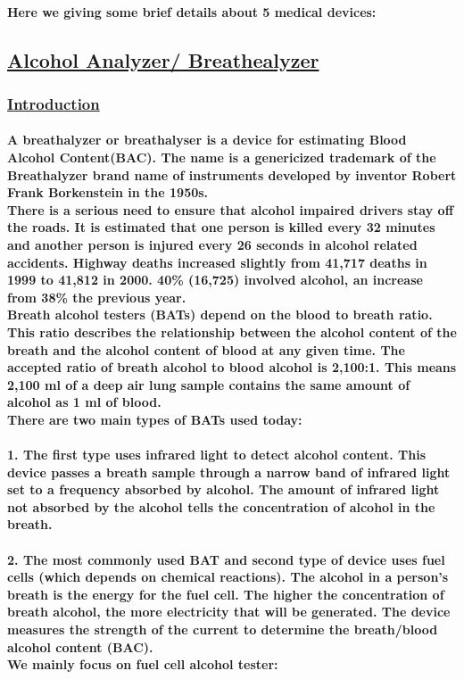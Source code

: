 \documentclass[12pt]{article}
\begin{document}
     \paragraph{Here we giving some brief details about 5 medical devices:  }
      \clearpage
      \subsection{\underline{Alcohol Analyzer/ Breathealyzer}}
        \subsubsection{\underline{Introduction}}
        \paragraph{ A breathalyzer or breathalyser is a device for estimating Blood Alcohol Content(BAC). The name is a genericized trademark of the Breathalyzer brand name of instruments developed by inventor Robert Frank Borkenstein in the 1950s.\\There is a serious need to ensure that alcohol impaired drivers stay off the roads. It is estimated that one person is killed every 32 minutes and another person is injured every 26 seconds in alcohol related accidents. Highway deaths increased slightly from 41,717 deaths in 1999 to 41,812 in 2000. 40\% (16,725) involved alcohol, an increase from 38\% the previous year.\\Breath alcohol testers (BATs) depend on the blood to breath ratio. This ratio describes the relationship between the alcohol content of the breath and the alcohol content of blood at any given time. The accepted ratio of breath alcohol to blood alcohol is 2,100:1. This means 2,100 ml of a deep air lung sample contains the same amount of alcohol as 1 ml of blood.\\There are two main types of BATs used today:
      	\\\\\textbf{1.} The first type uses infrared light to detect alcohol content. This device passes a breath sample through a narrow band of infrared light set to a frequency absorbed by alcohol. The amount of infrared light not absorbed by the alcohol tells the concentration of alcohol in the breath.
        \\\\\textbf{2.} The  most commonly used BAT and second type of device uses fuel cells (which depends on chemical reactions). The alcohol in a person's breath is the energy for the fuel cell. The higher the concentration of breath alcohol, the more electricity that will be generated. The device measures the strength of the current to determine the breath/blood alcohol content (BAC).
         \\We mainly focus on fuel cell alcohol tester:}
\end{document}
